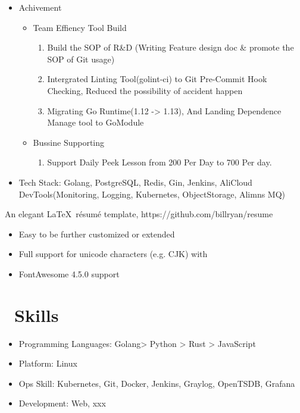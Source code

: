 \documentclass{resume}
\begin{document}
\begin{itemize}
  \item Achivement
        \begin{itemize}
          \item Team Effiency Tool Build
                \begin{enumerate}
                  \item Build the SOP of R&D (Writing Feature design doc & promote the SOP of Git usage)
                  \item Intergrated Linting Tool(golint-ci) to Git Pre-Commit Hook Checking, Reduced the possibility of accident happen
                  \item Migrating Go Runtime(1.12 -> 1.13), And Landing Dependence Manage tool to GoModule
                \end{enumerate}
          \item Bussine Supporting
                \begin{enumerate}
                  \item Support Daily Peek Lesson from 200 Per Day to 700 Per day.
                \end{enumerate}
        \end{itemize}
  \item Tech Stack: Golang, PostgreSQL, Redis, Gin, Jenkins, AliCloud DevTools(Monitoring, Logging, Kubernetes, ObjectStorage, Alimns MQ)
\end{itemize}


An elegant \LaTeX\ résumé template, https://github.com/billryan/resume
\begin{itemize}
  \item Easy to be further customized or extended
  \item Full support for unicode characters (e.g. CJK) with \XeLaTeX\
  \item FontAwesome 4.5.0 support
\end{itemize}



\section{\faCogs\ Skills}
\begin{itemize}[parsep=0.5ex]
  \item Programming Languages: Golang> Python > Rust > JavaScript
  \item Platform: Linux
  \item Ops Skill: Kubernetes, Git, Docker, Jenkins, Graylog, OpenTSDB, Grafana
  \item Development: Web, xxx
\end{itemize}
\end{document}
